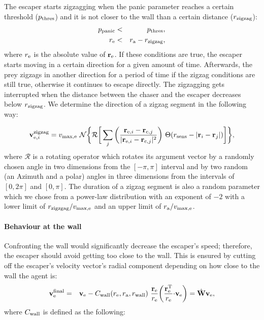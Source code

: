 \documentclass[12pt,a4paper,final]{iopart}
\newcommand{\revision}{\textcolor{black}}
\newcommand{\revisiontwo}{\textcolor{black}}
\begin{document}
The escaper starts zigzagging when the panic parameter reaches a certain threshold ($p_{\rm thres}$) and it is not closer to the wall than a certain distance ($r_{\rm zigzag}$):
\begin{eqnarray}
p_{\rm panic} &<& p_{\rm thres}, \\ r_{\rm e} &<& r_{\rm a} - r_{\rm zigzag},
\end{eqnarray} 
where $r_{\rm e}$ is the absolute value of ${\bf r}_{\rm e}$. If these conditions are true, the escaper starts moving in a certain direction for a given amount of time. Afterwards, the prey zigzags in another direction for a period of time if the zigzag conditions are still true, otherwise it continues to escape directly. The zigzagging gets interrupted when the distance between the chaser and the escaper decreases below $r_{\rm zigzag}$. We determine the direction of a zigzag segment in the following way:

\vspace{-0.5cm}
\begin{eqnarray}
{\bf v}_{\revision{\rm e}, i}^{\rm zigzag} = v_{\rm max, e} \  \mathcal{N} \bigg\{ \mathcal{R} \bigg[ \sum_j \bigg( \frac{{\bf r}_{{\rm e},i} - {\bf r}_{{\rm c},j}}{|{\bf r}_{{\rm e},i} - {\bf r}_{{\rm c},j}|^2} \bigg) \  \Theta(r_{\rm sens} - |{\bf r}_i - {\bf r}_j|) \bigg] \bigg\},
\end{eqnarray}
where $\mathcal{R} $ is a rotating operator which rotates its argument vector by a randomly chosen angle in two dimensions from the $[-\pi, \pi]$ interval and by two random (an Azimuth and a polar) angles in three dimensions from the intervals of $[0, 2\pi]$ and $[0, \pi]$. The duration of a zigzag segment is also a random parameter which we chose from a power-law distribution with an exponent of $-2$ with a lower limit of $r_{\rm zigzgag}/v_{\rm max,e}$ and an upper limit of $r_{\rm a}/v_{\rm max,e}$.

\paragraph{Behaviour at the wall} Confronting the wall would significantly decrease the escaper's speed; therefore, the escaper should avoid getting too close to the wall. This is ensured by cutting off the escaper's velocity vector's radial component depending on how close to the wall the agent is:
\begin{eqnarray}
{\bf v}_{\rm e}^{\rm final} & = & {\bf v}_{\rm e} - C_{\rm wall}(r_{\rm e}, r_{\rm a}, r_{\rm wall}) \  \frac{{\bf r}_{\rm e}}{{r}_{\rm e}}   \bigg( \frac{\revisiontwo{{\bf r}_{\rm e}^{\rm T}}}{{r}_{\rm e}}  \revision{\cdot}  {\bf v}_{\rm e} \bigg) = \hat{\rm \bf W} {\bf v}_{\rm e}, \label{eq:walll}
\end{eqnarray}
where $C_{\rm wall}$ is defined as the following:
\end{document}
